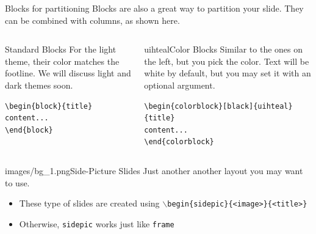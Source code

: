 \documentclass{beamer}
\begin{document}
\begin{frame}[fragile]{Blocks for partitioning}
Blocks are also a great way to partition your slide. They can be combined with columns, as shown here.
\begin{columns}
\begin{column}{0.3\textwidth}
\begin{block}{Standard Blocks}
For the light theme, their color matches the footline. We will discuss light and dark themes soon.
\begin{verbatim}
\begin{block}{title}
content...
\end{block}
\end{verbatim}
\end{block}
\end{column}
\begin{column}{0.7\textwidth}
\begin{colorblock}[black]{uihteal}{Color Blocks}
Similar to the ones on the left, but you pick the color. Text will be white by 
default, but you may set it with an optional argument.
\small
\begin{verbatim}
\begin{colorblock}[black]{uihteal}{title}
content...
\end{colorblock}
\end{verbatim}
\end{colorblock}
\end{column}
\end{columns}
\end{frame}


\begin{sidepic}{images/bg_1.png}{Side-Picture Slides}
Just another another layout you may want to use.
\begin{itemize}
\item These type of slides are created using \texttt{$\backslash$begin\{sidepic\}\{<image>\}\{<title>\}}
\item Otherwise, \texttt{sidepic} works just like \texttt{frame}
\end{itemize}
\end{sidepic}


\renewcommand{\algorithmicrequire}{\textbf{Input:}}
\renewcommand{\algorithmicensure}{\textbf{Output:}}
\newcommand*\CALL[2]{\textsc{#1}(#2)}
\newcommand*\ANNOTATE[1]{\hfill\(\triangleright\) #1}%

\footlinecolor{}
\end{document}
